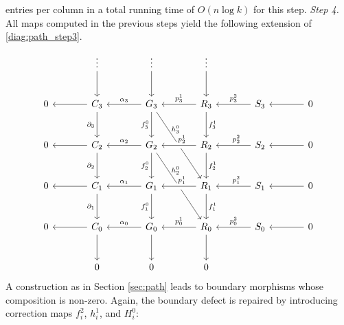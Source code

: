 entries per column in a total running time of $O(n\log k)$ for this step.
%
\textit{Step 4.} All maps computed in the previous steps yield the following extension of \eqref{diag:path_step3}.
%
\vspace{-12pt}
\begin{equation} \label{diag:logpath_double_complex_incomplete}
\begin{tikzcd} [column sep=large,row sep=large]
& \vdots \arrow[d] & \vdots \arrow[d] & \vdots \arrow[d] \\
0 & C_3 \arrow[l] \arrow[d,swap,"\partial_3"] & G_3 \arrow[l,swap,"\alpha_3"] \arrow[d,swap,"f_3^0"] \arrow[ddr,"h_3^0"{xshift=-10pt,yshift=10pt}] & R_3 \arrow[l,swap,"p_3^1"] \arrow[d,crossing over,"f_3^1"] & S_3 \arrow[l,swap,"p^2_3"] & 0 \arrow[l] \\
0 & C_2 \arrow[l] \arrow[d,swap,"\partial_2"] & G_2 \arrow[l,swap,"\alpha_2"] \arrow[d,swap,"f_2^0"] \arrow[ddr,"h_2^0"{xshift=-10pt,yshift=10pt}] & R_2 \arrow[l,swap,"p_2^1"{xshift=3pt},crossing over] \arrow[d,"f_2^1"] & S_2 \arrow[l,swap,"p^2_2"{xshift=3pt},crossing over]  & 0 \arrow[l] \\
0 & C_1 \arrow[l] \arrow[d,swap,"\partial_1"] & G_1 \arrow[l,swap,"\alpha_1"] \arrow[d,swap,"f_1^0"] & R_1 \arrow[l,swap,"p_1^1"{xshift=3pt},crossing over] \arrow[d,"f_1^1"] & S_1 \arrow[l,swap,"p^2_1"{xshift=3pt},crossing over] & 0 \arrow[l] \\
0 & C_0 \arrow[l] \arrow[d] & G_0 \arrow[l,swap,"\alpha_0"] \arrow[d] & R_0 \arrow[l,swap,"p_0^1"] \arrow[d] & S_0 \arrow[l,swap,"p^2_0"] & 0 \arrow[l] \\
& 0 & 0 & 0 
\end{tikzcd}
\end{equation} 
\noindent 
A construction as in Section \ref{sec:path} leads to boundary morphisms whose composition is non-zero. Again, the boundary defect is repaired by introducing correction maps $f^2_i$, $h^1_i$, and $H^0_i$:
%
\vspace{-12pt}
